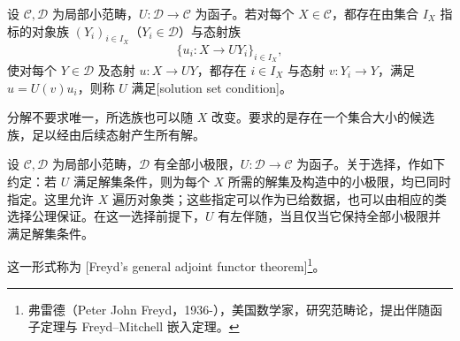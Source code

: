 \begin{definition}\label{b4:def:A-solution-set}
	设 \(\mathcal C,\mathcal D\) 为局部小范畴，\(U:\mathcal D\to\mathcal C\) 为函子。若对每个 \(X\in\mathcal C\)，都存在由集合 \(I_X\) 指标的对象族 \((Y_i)_{i\in I_X}\)（\(Y_i\in\mathcal D\)）与态射族
	\[
		\{u_i:X\to UY_i\}_{i\in I_X},
	\]
	使对每个 \(Y\in\mathcal D\) 及态射 \(u:X\to UY\)，都存在 \(i\in I_X\) 与态射 \(v:Y_i\to Y\)，满足 \(u=U(v)u_i\)，则称 \(U\) 满足[solution set condition]。
\end{definition}

分解不要求唯一，所选族也可以随 \(X\) 改变。要求的是存在一个集合大小的候选族，足以经由后续态射产生所有解。

\begin{theorem}[一般伴随函子定理]\label{b4:thm:A-general-adjoint-functor}
	设 \(\mathcal C,\mathcal D\) 为局部小范畴，\(\mathcal D\) 有全部小极限，\(U:\mathcal D\to\mathcal C\) 为函子。关于选择，作如下约定：若 \(U\) 满足解集条件，则为每个 \(X\) 所需的解集及构造中的小极限，均已同时指定。这里允许 \(X\) 遍历对象类；这些指定可以作为已给数据，也可以由相应的类选择公理保证。在这一选择前提下，\(U\) 有左伴随，当且仅当它保持全部小极限并满足解集条件。
\end{theorem}
这一形式称为 [Freyd's general adjoint functor theorem]\footnote{弗雷德（Peter John Freyd，1936-），美国数学家，研究范畴论，提出伴随函子定理与 Freyd--Mitchell 嵌入定理。}。

